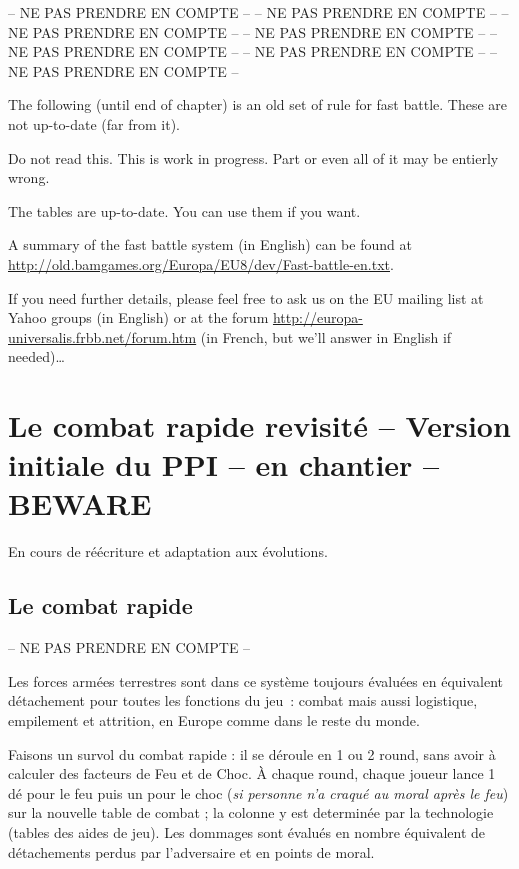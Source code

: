 
-- NE PAS PRENDRE EN COMPTE --
-- NE PAS PRENDRE EN COMPTE --
-- NE PAS PRENDRE EN COMPTE --
-- NE PAS PRENDRE EN COMPTE --
-- NE PAS PRENDRE EN COMPTE --
-- NE PAS PRENDRE EN COMPTE --
-- NE PAS PRENDRE EN COMPTE --

\begin{designnote}
The following (until end of chapter) is an old set of rule for fast
battle. These are not up-to-date (far from it).

Do not read this. This is work in progress. Part or even all of it may be
entierly wrong.

The tables are up-to-date. You can use them if you want.

A summary of the fast battle system (in English) can be found at
\url{http://old.bamgames.org/Europa/EU8/dev/Fast-battle-en.txt}.

If you need further details, please feel free to ask us on the EU mailing list
at Yahoo groups (in English) or at the forum
\url{http://europa-universalis.frbb.net/forum.htm} (in French, but we'll
answer in English if needed)\ldots
\end{designnote}

\section{Le combat rapide revisité -- Version initiale du PPI -- en chantier -- BEWARE}

En cours de réécriture et adaptation aux évolutions.

\subsection{Le combat rapide}
-- NE PAS PRENDRE EN COMPTE --

Les forces armées terrestres sont dans ce système toujours évaluées en équivalent détachement
pour toutes les fonctions du jeu~: combat mais aussi logistique, empilement
et attrition, en Europe comme dans le reste du monde.

Faisons un survol du combat rapide : il se déroule en 1 ou 2 round, sans avoir
à calculer des facteurs de Feu et de Choc. À
chaque round, chaque joueur lance 1 dé pour le feu puis un pour le choc (\textit{si
personne n'a craqué au moral après le feu}) sur la nouvelle table de combat ; la colonne y est
determinée par la technologie (tables des aides de jeu). Les dommages sont
évalués en nombre équivalent de détachements perdus par l'adversaire et en
points de moral.

